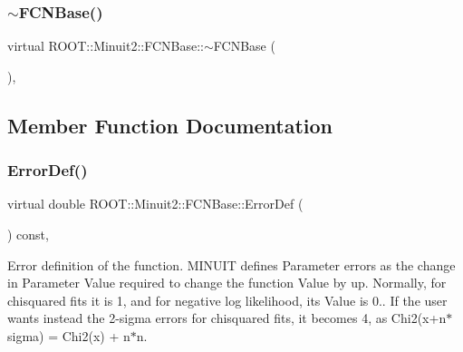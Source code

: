 \mbox{\label{classROOT_1_1Minuit2_1_1FCNBase_a2b80638970a23652d21c5f840c3979fa}} 
\subsubsection{\texorpdfstring{$\sim$FCNBase()}{~FCNBase()}\hspace{0.1cm}{\footnotesize\ttfamily [3/3]}}
{\footnotesize\ttfamily virtual R\+O\+O\+T\+::\+Minuit2\+::\+F\+C\+N\+Base\+::$\sim$\+F\+C\+N\+Base (\begin{DoxyParamCaption}{ }\end{DoxyParamCaption})\hspace{0.3cm}{\ttfamily [inline]}, {\ttfamily [virtual]}}



\subsection{Member Function Documentation}
\mbox{\label{classROOT_1_1Minuit2_1_1FCNBase_ac4592475c58a65b037ba97ab5f3cba10}} 
\subsubsection{\texorpdfstring{ErrorDef()}{ErrorDef()}\hspace{0.1cm}{\footnotesize\ttfamily [1/3]}}
{\footnotesize\ttfamily virtual double R\+O\+O\+T\+::\+Minuit2\+::\+F\+C\+N\+Base\+::\+Error\+Def (\begin{DoxyParamCaption}{ }\end{DoxyParamCaption}) const\hspace{0.3cm}{\ttfamily [inline]}, {\ttfamily [virtual]}}

Error definition of the function. M\+I\+N\+U\+IT defines Parameter errors as the change in Parameter Value required to change the function Value by up. Normally, for chisquared fits it is 1, and for negative log likelihood, its Value is 0.. If the user wants instead the 2-\/sigma errors for chisquared fits, it becomes 4, as Chi2(x+n$\ast$sigma) = Chi2(x) + n$\ast$n.

